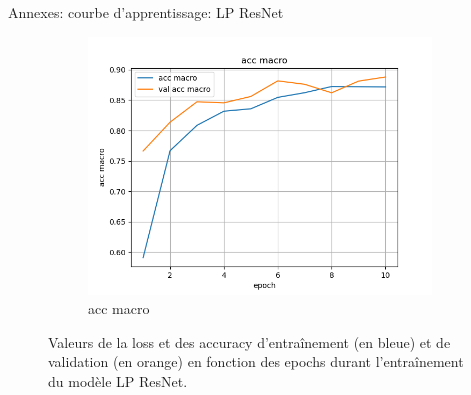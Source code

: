\documentclass[11pt]{beamer}
\begin{document}
\begin{frame}{Annexes: courbe d'apprentissage: LP ResNet}
\begin{figure}[ht]
        \begin{subfigure}{0.32\textwidth}
            \centering
            \includegraphics[width=\linewidth]{../logs/resnet_img256_0/acc macro.png}
            \caption{acc macro}
        \end{subfigure}
        \caption{Valeurs de la loss et des accuracy d'entraînement (en bleue) et de validation (en orange) en fonction des epochs durant l'entraînement du modèle LP ResNet.}
        \label{fig: train LP ResNet}
    \end{figure}
\end{frame}
\end{document}

